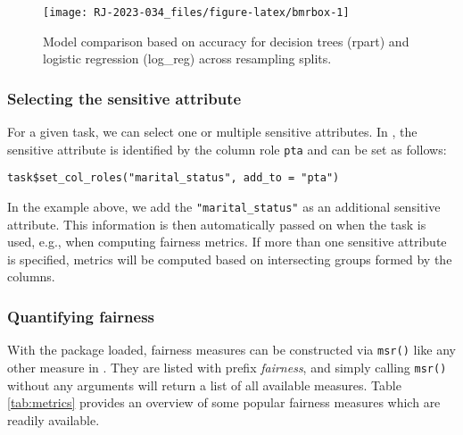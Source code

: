 \begin{figure}

{\centering \texttt{[image: RJ-2023-034\_files/figure-latex/bmrbox-1]} 

}

\caption{Model comparison based on accuracy for decision trees (rpart) and logistic regression (log\_reg) across resampling splits.}\label{fig:bmrbox}
\end{figure}

\hypertarget{selecting-the-sensitive-attribute}{%
\subsubsection{Selecting the sensitive attribute}\label{selecting-the-sensitive-attribute}}

For a given task, we can select one or multiple sensitive attributes.
In , the sensitive attribute is identified by the column role \texttt{pta} and can be set as follows:

\begin{verbatim}
task$set_col_roles("marital_status", add_to = "pta")
\end{verbatim}

In the example above, we add the \texttt{"marital\_status"} as an additional sensitive attribute.
This information is then automatically passed on when the task is used, e.g., when computing fairness metrics.
If more than one sensitive attribute is specified, metrics will be computed based on intersecting groups formed by the columns.

\hypertarget{quantifying-fairness-1}{%
\subsubsection{Quantifying fairness}\label{quantifying-fairness-1}}

With the  package loaded, fairness measures can be constructed via \texttt{msr()} like any other measure in .
They are listed with prefix \emph{fairness}, and simply calling \texttt{msr()} without any arguments will return a list of all available measures.
Table \ref{tab:metrics} provides an overview of some popular fairness measures which are readily available.

